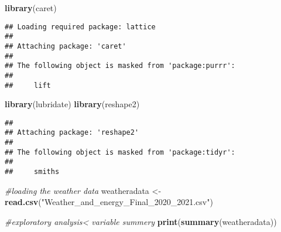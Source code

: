 \documentclass[
]{article}
\newenvironment{Shaded}{\begin{snugshade}}{\end{snugshade}}
\newcommand{\CommentTok}[1]{\textcolor[rgb]{0.56,0.35,0.01}{\textit{#1}}}
\newcommand{\FunctionTok}[1]{\textcolor[rgb]{0.13,0.29,0.53}{\textbf{#1}}}
\newcommand{\NormalTok}[1]{#1}
\newcommand{\OtherTok}[1]{\textcolor[rgb]{0.56,0.35,0.01}{#1}}
\newcommand{\StringTok}[1]{\textcolor[rgb]{0.31,0.60,0.02}{#1}}
\begin{document}
\begin{Shaded}
\begin{Highlighting}[]
\FunctionTok{library}\NormalTok{(caret)}
\end{Highlighting}
\end{Shaded}

\begin{verbatim}
## Loading required package: lattice
## 
## Attaching package: 'caret'
## 
## The following object is masked from 'package:purrr':
## 
##     lift
\end{verbatim}

\begin{Shaded}
\begin{Highlighting}[]
\FunctionTok{library}\NormalTok{(lubridate)}
\FunctionTok{library}\NormalTok{(reshape2)}
\end{Highlighting}
\end{Shaded}

\begin{verbatim}
## 
## Attaching package: 'reshape2'
## 
## The following object is masked from 'package:tidyr':
## 
##     smiths
\end{verbatim}

\begin{Shaded}
\begin{Highlighting}[]
\CommentTok{\#loading the weather  data}
\NormalTok{weatheradata }\OtherTok{\textless{}{-}} \FunctionTok{read.csv}\NormalTok{(}\StringTok{"Weather\_and\_energy\_Final\_2020\_2021.csv"}\NormalTok{)}

\CommentTok{\#exploratory analysis\textless{} variable summery }
\FunctionTok{print}\NormalTok{(}\FunctionTok{summary}\NormalTok{(weatheradata))}
\end{Highlighting}
\end{Shaded}
\end{document}
